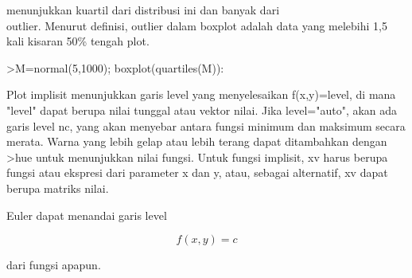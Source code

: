 \documentclass{article}
\begin{document}
\begin{eulernotebook}
\begin{eulercomment}
\begin{eulercomment}
\begin{eulercomment}
\begin{eulercomment}
\begin{eulercomment}
\begin{eulercomment}
\begin{eulercomment}
\begin{eulercomment}
\begin{eulercomment}
\begin{eulercomment}
\begin{eulercomment}
\begin{eulercomment}
\begin{eulercomment}
\begin{eulercomment}
\begin{eulercomment}
\begin{eulercomment}
\begin{eulercomment}
\begin{eulercomment}
\begin{eulercomment}
\begin{eulercomment}
\begin{eulercomment}
\begin{eulercomment}
\begin{eulercomment}
\begin{eulercomment}
\begin{eulercomment}
\begin{eulercomment}
\begin{eulercomment}
menunjukkan kuartil dari distribusi ini dan banyak dari\\
outlier. Menurut definisi, outlier dalam boxplot adalah data yang
melebihi 1,5 kali kisaran 50\% tengah plot.
\end{eulercomment}
\begin{eulerprompt}
>M=normal(5,1000); boxplot(quartiles(M)):
\end{eulerprompt}
\begin{eulercomment}
Plot implisit menunjukkan garis level yang menyelesaikan f(x,y)=level,
di mana "level" dapat berupa nilai tunggal atau vektor nilai. Jika
level="auto", akan ada garis level nc, yang akan menyebar antara
fungsi minimum dan maksimum secara merata. Warna yang lebih gelap atau
lebih terang dapat ditambahkan dengan \textgreater{}hue untuk menunjukkan nilai
fungsi. Untuk fungsi implisit, xv harus berupa fungsi atau ekspresi
dari parameter x dan y, atau, sebagai alternatif, xv dapat berupa
matriks nilai.

Euler dapat menandai garis level

\end{eulercomment}
\begin{eulerformula}
\[
f(x,y) = c
\]
\end{eulerformula}
\begin{eulercomment}
dari fungsi apapun.


\end{eulercomment}
\end{eulercomment}
\end{eulercomment}
\end{eulercomment}
\end{eulercomment}
\end{eulercomment}
\end{eulercomment}
\end{eulercomment}
\end{eulercomment}
\end{eulercomment}
\end{eulercomment}
\end{eulercomment}
\end{eulercomment}
\end{eulercomment}
\end{eulercomment}
\end{eulercomment}
\end{eulercomment}
\end{eulercomment}
\end{eulercomment}
\end{eulercomment}
\end{eulercomment}
\end{eulercomment}
\end{eulercomment}
\end{eulercomment}
\end{eulercomment}
\end{eulercomment}
\end{eulercomment}
\end{eulernotebook}
\end{document}
